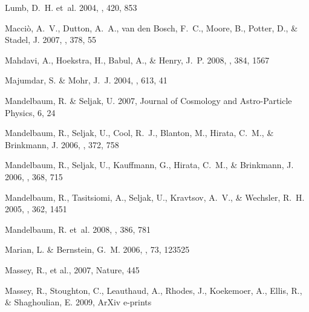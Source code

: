 \documentclass[12pt]{emulateapj}
\begin{document}
\begin{thebibliography}{111}
{Lumb}, D.~H. {et~al.} 2004, \aap, 420, 853

{Macci{\`o}}, A.~V., {Dutton}, A.~A., {van den Bosch}, F.~C., {Moore}, B.,
  {Potter}, D., \& {Stadel}, J. 2007, \mnras, 378, 55

{Mahdavi}, A., {Hoekstra}, H., {Babul}, A., \& {Henry}, J.~P. 2008, \mnras,
  384, 1567

{Majumdar}, S. \& {Mohr}, J.~J. 2004, \apj, 613, 41

{Mandelbaum}, R. \& {Seljak}, U. 2007, Journal of Cosmology and Astro-Particle
  Physics, 6, 24

{Mandelbaum}, R., {Seljak}, U., {Cool}, R.~J., {Blanton}, M., {Hirata}, C.~M.,
  \& {Brinkmann}, J. 2006{}, \mnras, 372, 758

{Mandelbaum}, R., {Seljak}, U., {Kauffmann}, G., {Hirata}, C.~M., \&
  {Brinkmann}, J. 2006{}, \mnras, 368, 715

{Mandelbaum}, R., {Tasitsiomi}, A., {Seljak}, U., {Kravtsov}, A.~V., \&
  {Wechsler}, R.~H. 2005, \mnras, 362, 1451

{Mandelbaum}, R. {et~al.} 2008, \mnras, 386, 781

{Marian}, L. \& {Bernstein}, G.~M. 2006, \prd, 73, 123525

{Massey}, R., et al., 2007, Nature, 445

{Massey}, R., {Stoughton}, C., {Leauthaud}, A., {Rhodes}, J., {Koekemoer}, A.,
  {Ellis}, R., \& {Shaghoulian}, E. 2009, ArXiv e-prints


\end{thebibliography}
\end{document}
